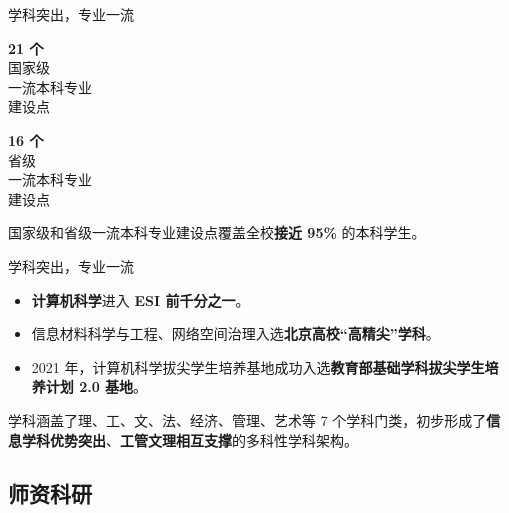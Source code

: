 \documentclass[aspectratio=169, utf8]{beamer}
\begin{document}
\begin{frame}{学科突出，专业一流}
    \begin{multicols}{2}
        \begin{center}
            \LARGE\textcolor{Fore}{\textbf{21 个}}\\[0.5em]

            \normalsize 国家级\\一流本科专业\\建设点
        \end{center}

        \begin{center}
            \LARGE\textcolor{Fore}{\textbf{16 个}}\\[0.5em]

            \normalsize 省级\\一流本科专业\\建设点
        \end{center}
    \end{multicols}

    国家级和省级一流本科专业建设点覆盖全校\textcolor{Fore}{\textbf{接近 95\%}} 的本科学生。
\end{frame}

\begin{frame}{学科突出，专业一流}
    \begin{itemize}
        \item \textcolor{Fore}{\textbf{计算机科学}}进入 \textcolor{Fore}{\textbf{ESI 前千分之一}}。
        \item 信息材料科学与工程、网络空间治理入选\textcolor{Fore}{\textbf{北京高校“高精尖”学科}}。
        \item 2021 年，计算机科学拔尖学生培养基地成功入选\textcolor{Fore}{\textbf{教育部基础学科拔尖学生培养计划 2.0 基地}}。
    \end{itemize}

    学科涵盖了理、工、文、法、经济、管理、艺术等 7 个学科门类，初步形成了\textcolor{Fore}{\textbf{信息学科优势突出}}、\textcolor{Fore}{\textbf{工管文理相互支撑}}的多科性学科架构。
\end{frame}

\subsection*{师资科研}
\end{document}
